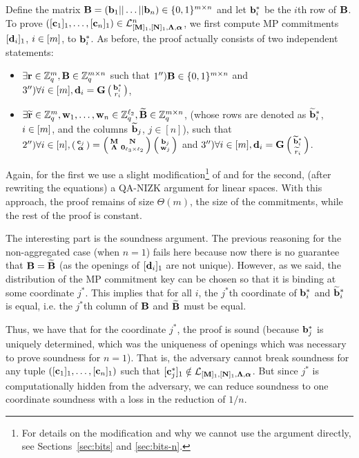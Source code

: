 Define the matrix $\mathbf{{B}}=(\mathbf{b}_1|| \ldots || \mathbf{b}_n) \in \{0,1\}^{{m} \times n}$ and let $\mathbf{b}_i^*$ be the $i$th row of $\mathbf{{B}}$. To prove $([\mathbf{c}_1]_1,\ldots, [\mathbf{c}_n]_1) \in\mathcal{L}_{[\mathbf{{M}}]_1,[\mathbf{{N}}]_1,\mathbf{{\Lambda}},{\boldsymbol \alpha}}^n$, we first compute MP commitments $[\mathbf{d}_i]_1$, $i \in [{m}]$, to $\mathbf{b}_i^*$.  As before, 
the proof actually consists of two independent statements:
\begin{itemize}
\item $\exists \mathbf{r} \in \mathbb{Z}_q^{m}, \mathbf{{B}} \in \mathbb{Z}_q^{{m} \times n}$ such that  
$1'') \mathbf{{B}} \in \{0,1\}^{{m} \times n}$ and $3'') \forall i \in [m], \mathbf{d}_i=\mathbf{{G}}\left(\begin{smallmatrix}\mathbf{b}_i^*  \\ r_i\end{smallmatrix}\right)$,
\item $\exists \widetilde{\mathbf{r}}\in\mathbb{Z}_q^{m}, \mathbf{w}_1,\ldots,\mathbf{w}_n \in\mathbb{Z}_q^{\ell_2}, \widetilde{\mathbf{{B}}} \in \mathbb{Z}_q^{{m} \times n}$, (whose rows are denoted as $\widetilde{\mathbf{b}}_i^*$, $i \in [{m}]$, and the columns $\widetilde{\mathbf{b}}_j$, $j \in [n]$), such that  
   $2'')\forall i\in[n], \left(\begin{smallmatrix}
    \mathbf{c}_j\\
    {\boldsymbol \alpha}
\end{smallmatrix}\right)
=
\left(\begin{smallmatrix}
    \mathbf{{M}}       & \mathbf{{N}}\\
    \mathbf{{\Lambda}} & \mathbf{{0}}_{{\ell_3}\times {\ell_2}}
\end{smallmatrix}\right)
\left(\begin{smallmatrix}
    \mathbf{b}_j\\
    \mathbf{w}_j
\end{smallmatrix}\right)$ and $3'') \forall i \in [{m}], \mathbf{d}_i=\mathbf{{G}}   \left(\begin{smallmatrix}\widetilde{\mathbf{b}}^*_i  \\ \widetilde{r}_i\end{smallmatrix}\right)$.
\end{itemize}
Again, for the first we use a slight modification\footnote{For details on the modification and why we cannot use the argument directly, see Sections~\ref{sec:bits} and \ref{sec:bits-n}.} of \cite{AC:GonHevRaf15} and for the second, (after rewriting the equations) a QA-NIZK argument for linear spaces. With this approach, the proof remains of size $\Theta(m)$, the size of the commitments, while the rest of the proof is constant. 

The interesting part is the soundness argument. The previous reasoning for the non-aggregated case (when $n=1$) fails here because now there is no guarantee that 
 $\mathbf{{B}}=\widetilde{\mathbf{{B}}}$ (as the openings of $[\mathbf{d}_i]_1$ are not unique).  However, as we said, the distribution of the MP commitment key can be chosen so that it is binding at some coordinate $j^*$. This implies that for all $i$, the $j^*$th coordinate of $\mathbf{b}_i^*$ and $\widetilde{\mathbf{b}}_i^*$ is equal, i.e. the $j^*$th column of $\mathbf{{B}}$ and $\widetilde{\mathbf{{B}}}$ must be equal.  

Thus, we have that for the coordinate $j^*$, the proof is sound (because $\mathbf{b}_j^*$ is uniquely determined, which was the uniqueness of openings which was necessary to prove soundness for $n=1$). That is, the adversary cannot break soundness for any tuple $([\mathbf{c}_1]_1,\ldots, [\mathbf{c}_n]_1)$ such that $[\mathbf{c}_j^*]_1 \notin \mathcal{L}_{[\mathbf{{M}}]_1,[\mathbf{{N}}]_1,\mathbf{{\Lambda}},{\boldsymbol \alpha}}$. But since $j^*$ is computationally hidden 
from the adversary, we can reduce soundness to one coordinate soundness with a loss in the reduction of $1/n$. 

